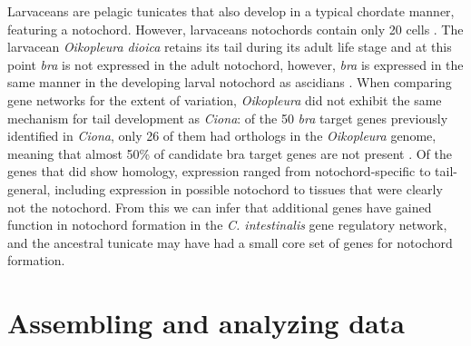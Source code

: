 Larvaceans are pelagic tunicates that also develop in a typical chordate manner, featuring  a notochord. However, larvaceans notochords contain only 20 cells \cite{seo_miniature_2001,denoeud_plasticity_2010}. The larvacean  \textit{Oikopleura dioica} retains its tail during its adult life stage and at this point \textit{bra} is not expressed in the adult notochord, however, \textit{bra} is expressed in the same manner in the developing larval notochord as ascidians \cite{bassham_brachyury_2000,nishida_development_2008}. When comparing gene networks for the extent of variation, \textit{Oikopleura} did not exhibit the same mechanism for tail development as \textit{Ciona}: of the 50 {\em bra} target genes previously identified in \textit{Ciona}, only 26 of them had orthologs in the \textit{Oikopleura} genome, meaning that almost 50\% of candidate bra target  genes are not present \cite{kugler_evolutionary_2011}. Of the genes that did show homology, expression ranged from notochord-specific to tail-general, including expression in possible notochord to tissues that were clearly not the notochord. From this we can infer that additional genes have gained function in notochord formation in the \textit{C. intestinalis} gene regulatory network, and the ancestral tunicate may have had a small core set of genes for notochord formation.

\section{Assembling and analyzing data}

